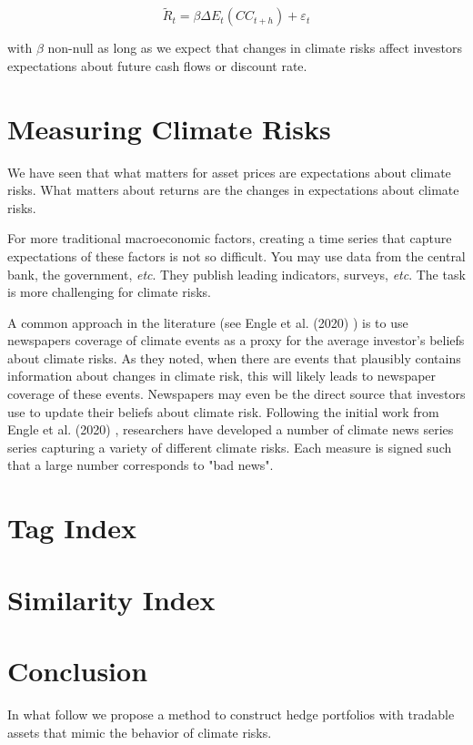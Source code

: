 \begin{equation}
    \tilde{R}_t = \beta \Delta E_t(CC_{t+h}) + \varepsilon_t
\end{equation}


with $\beta$ non-null as long as we expect 
that changes in climate risks affect investors 
expectations about future cash flows or discount rate.


\section{Measuring Climate Risks}

We have seen that what matters for asset prices
are expectations about climate risks. What 
matters about returns are the changes in
expectations about climate risks.

For more traditional macroeconomic factors, 
creating a time series that capture expectations 
of these factors is not so difficult. You may 
use data from the central bank, the government,
\textit{etc}. They publish leading indicators,
surveys, \textit{etc}. The task is more 
challenging for climate risks.

A common approach in the literature (see Engle et al. (2020) \cite{engle2020hedging})
is to use newspapers coverage of climate events as a proxy 
for the average investor's beliefs about climate risks.
As they noted, when there are events that plausibly
contains information about changes in climate risk,
this will likely leads to newspaper coverage of these events.
Newspapers may even be the direct source that investors
use to update their beliefs about climate risk.
Following the initial work from Engle et al. (2020) \cite{engle2020hedging},
researchers have developed a number of climate 
news series series capturing a variety of different climate risks.
Each measure is signed such that a large number 
corresponds to "bad news".




\section{Tag Index}


\section{Similarity Index}

\section{Conclusion}

In what follow we propose a method to construct
hedge portfolios with tradable assets that
mimic the behavior of climate risks. 
